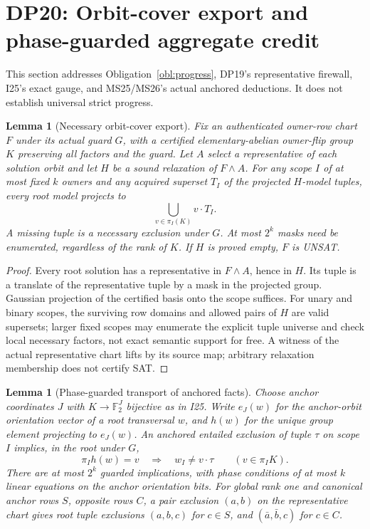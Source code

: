 \documentclass[11pt]{article}
\newtheorem{lemma}[theorem]{Lemma}
\begin{document}
\section{DP20: Orbit-cover export and phase-guarded aggregate credit}\label{sec:dp20}
This section addresses Obligation~\ref{obl:progress}, DP19's representative firewall, I25's exact gauge, and MS25/MS26's actual anchored deductions. It does not establish universal strict progress.
\begin{lemma}[Necessary orbit-cover export]\label{lem:dp20-cover}
Fix an authenticated owner-row chart $F$ under its actual guard $G$, with a certified elementary-abelian owner-flip group $K$ preserving all factors and the guard. Let $A$ select a representative of each solution orbit and let $H$ be a sound relaxation of $F\land A$. For any scope $I$ of at most fixed $k$ owners and any acquired superset $T_I$ of the projected $H$-model tuples, every root model projects to
\[
 \bigcup_{v\in\pi_I(K)}v\cdot T_I.
\]
A missing tuple is a necessary exclusion under $G$. At most $2^k$ masks need be enumerated, regardless of the rank of $K$. If $H$ is proved empty, $F$ is UNSAT.
\end{lemma}
\begin{proof}
Every root solution has a representative in $F\land A$, hence in $H$. Its tuple is a translate of the representative tuple by a mask in the projected group. Gaussian projection of the certified basis onto the scope suffices. For unary and binary scopes, the surviving row domains and allowed pairs of $H$ are valid supersets; larger fixed scopes may enumerate the explicit tuple universe and check local necessary factors, not exact semantic support for free. A witness of the actual representative chart lifts by its source map; arbitrary relaxation membership does not certify SAT.
\end{proof}
\begin{lemma}[Phase-guarded transport of anchored facts]\label{lem:dp20-phase}
Choose anchor coordinates $J$ with $K\to\mathbb F_2^J$ bijective as in I25. Write $e_J(w)$ for the anchor-orbit orientation vector of a root transversal $w$, and $h(w)$ for the unique group element projecting to $e_J(w)$. An anchored entailed exclusion of tuple $\tau$ on scope $I$ implies, in the root under $G$,
\[
 \pi_I h(w)=v\quad\Longrightarrow\quad w_I\ne v\cdot\tau
 \qquad(v\in\pi_I K).
\]
There are at most $2^k$ guarded implications, with phase conditions of at most $k$ linear equations on the anchor orientation bits. For global rank one and canonical anchor rows $S$, opposite rows $C$, a pair exclusion $(a,b)$ on the representative chart gives root tuple exclusions $(a,b,c)$ for $c\in S$, and $(\bar a,\bar b,c)$ for $c\in C$.
\end{lemma}
\end{document}
